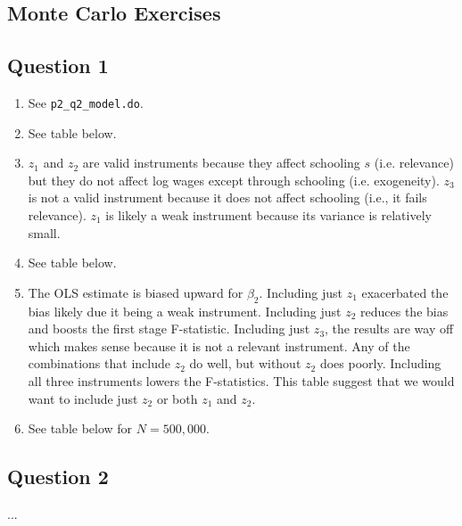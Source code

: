 \documentclass{article}
\begin{document}
\begin{landscape}

\section{Monte Carlo Exercises}

\subsection{Question 1}

\begin{enumerate}

\item See \texttt{p2\_q2\_model.do}.

\item See table below.

\item  $z_1$ and $z_2$ are valid instruments because they affect schooling $s$ (i.e. relevance) but they do not affect log wages except through schooling (i.e. exogeneity). $z_3$ is not a valid instrument because it does not affect schooling (i.e., it fails relevance). $z_1$ is likely a weak instrument because its variance is relatively small.

\item See table below.



\item The OLS estimate is biased upward for $\beta_2$.  Including just $z_1$ exacerbated the bias likely due it being a weak instrument. Including just $z_2$ reduces the bias and boosts the first stage F-statistic. Including just $z_3$, the results are way off which makes sense because it is not a relevant instrument. Any of the combinations that include $z_2$ do well, but without $z_2$ does poorly. Including all three instruments lowers the F-statistics.  This table suggest that we would want to include just $z_2$ or both $z_1$ and $z_2$.

\pagebreak

\item See table below for $N = 500,000$.



\end{enumerate}

\subsection{Question 2}

...

\end{landscape}
\end{document}
